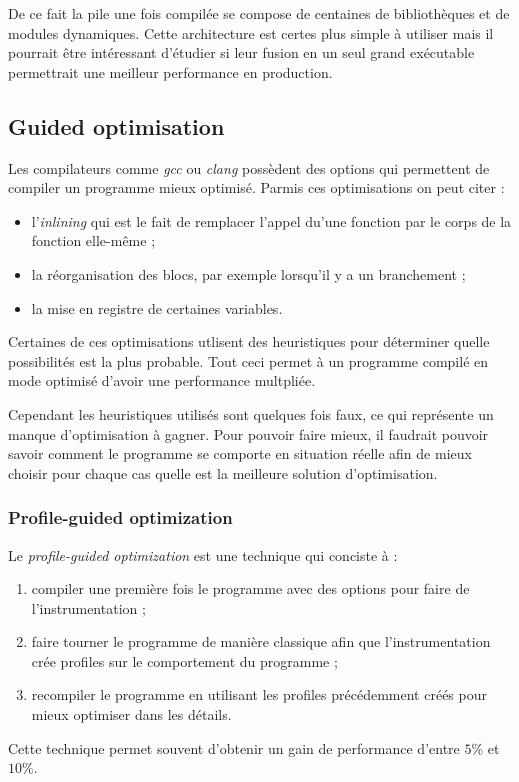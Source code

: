 \documentclass[a4paper]{report}
\begin{document}
                De ce fait la pile une fois compilée se compose de centaines de bibliothèques et de modules dynamiques.
                Cette architecture est certes plus simple à utiliser mais il pourrait être intéressant d'étudier si leur fusion en un seul grand exécutable permettrait une meilleur performance en production.

        \subsection{Guided optimisation}
            Les compilateurs comme \emph{gcc} ou \emph{clang} possèdent des options qui permettent de compiler un programme mieux optimisé.
            Parmis ces optimisations on peut citer :
            \begin{itemize}
                \item l'\emph{inlining} qui est le fait de remplacer l'appel du'une fonction par le corps de la fonction elle-même ;
                \item la réorganisation des blocs, par exemple lorsqu'il y a un branchement ;
                \item la mise en registre de certaines variables.
            \end{itemize}
            Certaines de ces optimisations utlisent des heuristiques pour déterminer quelle possibilités est la plus probable.
            Tout ceci permet à un programme compilé en mode optimisé d'avoir une performance multpliée.

            Cependant les heuristiques utilisés sont quelques fois faux, ce qui représente un manque d'optimisation à gagner.
            Pour pouvoir faire mieux, il faudrait pouvoir savoir comment le programme se comporte en situation réelle afin de mieux choisir pour chaque cas quelle est la meilleure solution d'optimisation.

            \subsubsection{Profile-guided optimization}
                Le \emph{profile-guided optimization} est une technique qui conciste à :
                \begin{enumerate}
                    \item compiler une première fois le programme avec des options pour faire de l'instrumentation ;
                    \item faire tourner le programme de manière classique afin que l'instrumentation crée profiles sur le comportement du programme ;
                    \item recompiler le programme en utilisant les profiles précédemment créés pour mieux optimiser dans les détails.
                \end{enumerate}
                Cette technique permet souvent d'obtenir un gain de performance d'entre $5\%$ et $10\%$.
\end{document}
